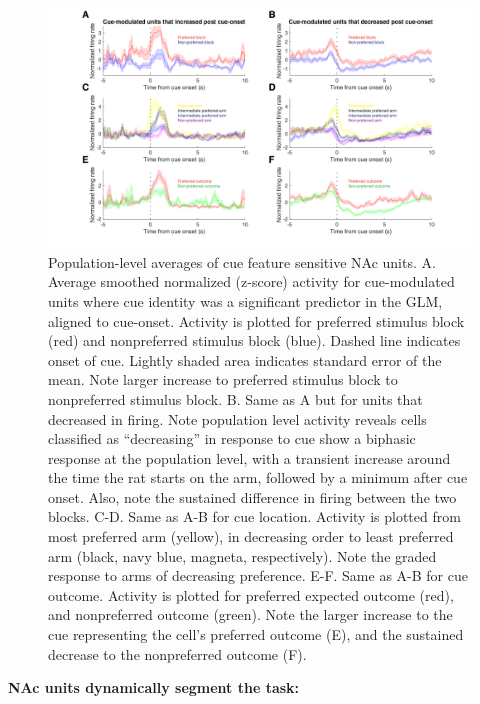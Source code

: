 \documentclass[11pt]{article}
\begin{document}
\begin{figure}[h]
\centering
\includegraphics[width=\textwidth]{Fig 7 - Population averages.png}
\caption{Population-level averages of cue feature sensitive NAc units. A. Average smoothed normalized (z-score) activity for cue-modulated units where cue identity was a significant predictor in the GLM, aligned to cue-onset. Activity is plotted for preferred stimulus block (red) and nonpreferred stimulus block (blue). Dashed line indicates onset of cue. Lightly shaded area indicates standard error of the mean. Note larger increase to preferred stimulus block to nonpreferred stimulus block. B. Same as A but for units that decreased in firing. Note population level activity reveals cells classified as “decreasing” in response to cue show a biphasic response at the population level, with a transient increase around the time the rat starts on the arm, followed by a minimum after cue onset. Also, note the sustained difference in firing between the two blocks. C-D. Same as A-B for cue location. Activity is plotted from most preferred arm (yellow), in decreasing order to least preferred arm (black, navy blue, magneta, respectively). Note the graded response to arms of decreasing preference. E-F. Same as A-B for cue outcome. Activity is plotted for preferred expected outcome (red), and nonpreferred outcome (green). Note the larger increase to the cue representing the cell’s preferred outcome (E), and the sustained decrease to the nonpreferred outcome (F).}
\label{fig:pop}
\end{figure}

{\bf NAc units dynamically segment the task:}
\end{document}

